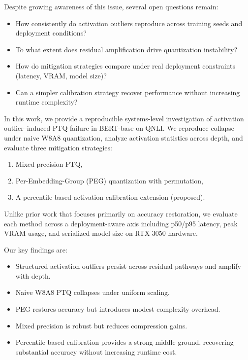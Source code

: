 \documentclass[conference]{IEEEtran}
\begin{document}
Despite growing awareness of this issue, several open questions remain:

\begin{itemize}
\item How consistently do activation outliers reproduce across training seeds and deployment conditions?
\item To what extent does residual amplification drive quantization instability?
\item How do mitigation strategies compare under real deployment constraints (latency, VRAM, model size)?
\item Can a simpler calibration strategy recover performance without increasing runtime complexity?
\end{itemize}

In this work, we provide a reproducible systems-level investigation of activation outlier–induced PTQ failure in BERT-base on QNLI. We reproduce collapse under naive W8A8 quantization, analyze activation statistics across depth, and evaluate three mitigation strategies:

\begin{enumerate}
\item Mixed precision PTQ,
\item Per-Embedding-Group (PEG) quantization with permutation,
\item A percentile-based activation calibration extension (proposed).
\end{enumerate}

Unlike prior work that focuses primarily on accuracy restoration, we evaluate each method across a deployment-aware axis including p50/p95 latency, peak VRAM usage, and serialized model size on RTX 3050 hardware.

Our key findings are:

\begin{itemize}
\item Structured activation outliers persist across residual pathways and amplify with depth.
\item Naive W8A8 PTQ collapses under uniform scaling.
\item PEG restores accuracy but introduces modest complexity overhead.
\item Mixed precision is robust but reduces compression gains.
\item Percentile-based calibration provides a strong middle ground, recovering substantial accuracy without increasing runtime cost.
\end{itemize}
\end{document}
